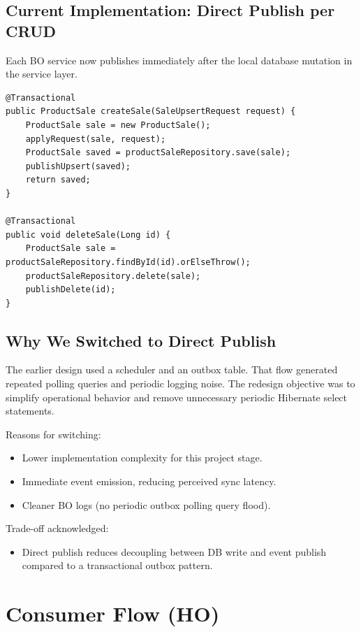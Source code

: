 \documentclass[11pt,a4paper]{article}
\begin{document}
\subsection{Current Implementation: Direct Publish per CRUD}
Each BO service now publishes immediately after the local database mutation in the service layer.

\begin{lstlisting}[style=javastyle,caption={BO direct publish on create/update/delete}]
@Transactional
public ProductSale createSale(SaleUpsertRequest request) {
    ProductSale sale = new ProductSale();
    applyRequest(sale, request);
    ProductSale saved = productSaleRepository.save(sale);
    publishUpsert(saved);
    return saved;
}

@Transactional
public void deleteSale(Long id) {
    ProductSale sale = productSaleRepository.findById(id).orElseThrow();
    productSaleRepository.delete(sale);
    publishDelete(id);
}
\end{lstlisting}

\subsection{Why We Switched to Direct Publish}
The earlier design used a scheduler and an outbox table. That flow generated repeated polling queries and periodic logging noise. The redesign objective was to simplify operational behavior and remove unnecessary periodic Hibernate select statements.

Reasons for switching:
\begin{itemize}[leftmargin=*]
  \item Lower implementation complexity for this project stage.
  \item Immediate event emission, reducing perceived sync latency.
  \item Cleaner BO logs (no periodic outbox polling query flood).
\end{itemize}

Trade-off acknowledged:
\begin{itemize}[leftmargin=*]
  \item Direct publish reduces decoupling between DB write and event publish compared to a transactional outbox pattern.
\end{itemize}

\section{Consumer Flow (HO)}
\end{document}
